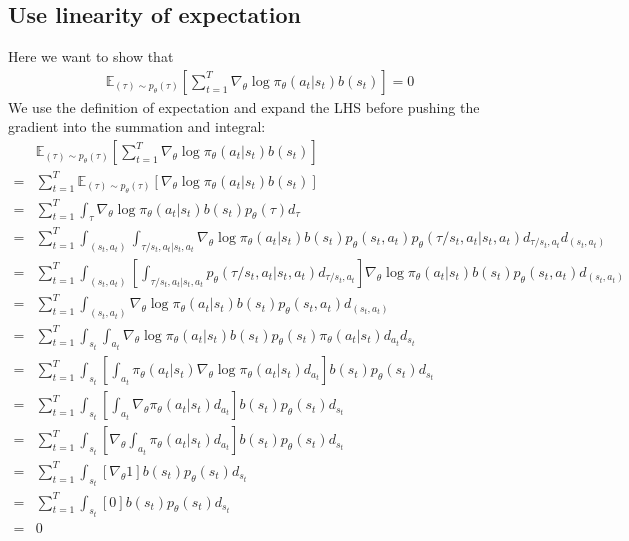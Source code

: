 \documentclass[12pt]{article}
\begin{document}
	\subsection{Use linearity of expectation} 
	Here we want to show that
	\begin{align*}
		\mathbb{E}_{(\tau)\sim p_\theta(\tau)}\left[\sum_{t=1}^{T} \nabla_\theta \log \pi_\theta(a_t|s_t) b(s_t)\right] = 0
	\end{align*}
	We use the definition of expectation and expand the LHS before pushing the gradient into the summation and integral:
	\begin{align*}
	  & \mathbb{E}_{(\tau)\sim p_\theta(\tau)}\left[\sum_{t=1}^{T} \nabla_\theta \log \pi_\theta(a_t|s_t) b(s_t)\right] \\
	= & \sum_{t=1}^{T} \mathbb{E}_{(\tau)\sim p_\theta(\tau)}\left[ \nabla_\theta \log \pi_\theta(a_t|s_t) b(s_t)\right] \\
	= & \sum_{t=1}^{T} \int_\tau \nabla_\theta \log \pi_\theta(a_t|s_t) b(s_t) p_\theta(\tau) d_{\tau} \\
	= & \sum_{t=1}^{T} \int_{(s_t, a_t)} \int_{\tau/s_t, a_t|s_t, a_t} \nabla_\theta \log \pi_\theta(a_t|s_t) b(s_t) p_\theta(s_t, a_t)p_\theta(\tau/s_t, a_t|s_t, a_t) d_{\tau/s_t, a_t} d_{(s_t, a_t)} \\
	= & \sum_{t=1}^{T} \int_{(s_t, a_t)}  \left[\int_{\tau/s_t, a_t|s_t, a_t} p_\theta(\tau/s_t, a_t|s_t, a_t) d_{\tau/s_t, a_t} \right] \nabla_\theta \log \pi_\theta(a_t|s_t) b(s_t) p_\theta(s_t, a_t) d_{(s_t, a_t)}  \\
	= & \sum_{t=1}^{T} \int_{(s_t, a_t)}  \nabla_\theta \log \pi_\theta(a_t|s_t) b(s_t) p_\theta(s_t, a_t) d_{(s_t, a_t)}  \\
	= & \sum_{t=1}^{T} \int_{s_t} \int_{a_t} \nabla_\theta \log \pi_\theta(a_t|s_t) b(s_t) p_\theta(s_t) \pi_\theta(a_t|s_t) d_{a_t} d_{s_t}  \\
	= & \sum_{t=1}^{T} \int_{s_t} \left[\int_{a_t}  \pi_\theta(a_t|s_t) \nabla_\theta \log \pi_\theta(a_t|s_t) d_{a_t} \right] b(s_t) p_\theta(s_t)   d_{s_t}  \\
	= & \sum_{t=1}^{T} \int_{s_t} \left[\int_{a_t}  \nabla_\theta \pi_\theta(a_t|s_t) d_{a_t} \right] b(s_t) p_\theta(s_t)   d_{s_t}  \\
	= & \sum_{t=1}^{T} \int_{s_t} \left[\nabla_\theta \int_{a_t}  \pi_\theta(a_t|s_t) d_{a_t} \right] b(s_t) p_\theta(s_t)   d_{s_t}  \\
	= & \sum_{t=1}^{T} \int_{s_t} \left[\nabla_\theta 1 \right] b(s_t) p_\theta(s_t)   d_{s_t}  \\
	= & \sum_{t=1}^{T} \int_{s_t} \left[0 \right] b(s_t) p_\theta(s_t)   d_{s_t}  \\
	= & 0
	\end{align*}
	\pagebreak
\end{document}
